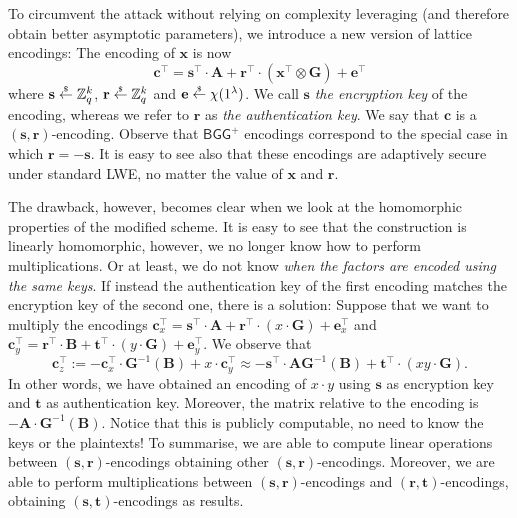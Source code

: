 \documentclass{theoretics}
\newcommand{\getsr}{\overset{\raisebox{-1pt}{$\scriptscriptstyle \$$}}{\gets}}
\newcommand{\sample}{\getsr}
\newcommand{\Z}{\mathbb{Z}}
\renewcommand{\sec}{\ensuremath{\lambda}}
\newcommand\bbbone{1}
\begin{document}
To circumvent the attack without relying on complexity leveraging (and therefore obtain better asymptotic parameters), we introduce a new version of lattice encodings: The encoding of $\mathbf{x}$ is now
\[\mathbf{c}^\intercal=\mathbf{s}^\intercal\cdot \mathbf{A}+\mathbf{r}^\intercal\cdot (\mathbf{x}^\intercal\otimes \mathbf{G})+\mathbf{e}^\intercal\]
where $\mathbf{s}\sample\Z_q^k$, $\mathbf{r}\sample\Z_q^k$ and $\mathbf{e}\sample\chi(\bbbone^\sec)$. We call $\mathbf{s}$ \emph{the encryption key} of the encoding, whereas we refer to $\mathbf{r}$ as \emph{the authentication key}. We say that $\mathbf{c}$ is a $(\mathbf{s}, \mathbf{r})$-encoding. Observe that $\mathsf{BGG^+}$ encodings correspond to the special case in which $\mathbf{r}=-\mathbf{s}$. It is easy to see also that these encodings are adaptively secure under standard LWE, no matter the value of $\mathbf{x}$ and $\mathbf{r}$.

The drawback, however, becomes clear when we look at the homomorphic properties of the modified scheme. It is easy to see that the construction is linearly homomorphic, however, we no longer know how to perform multiplications. Or at least, we do not know \emph{when the factors are encoded using the same keys}. If instead the authentication key of the first encoding matches the encryption key of the second one, there is a solution: Suppose that we want to multiply the encodings $\mathbf{c}_x^\intercal=\mathbf{s}^\intercal\cdot \mathbf{A}+\mathbf{r}^\intercal\cdot (x\cdot \mathbf{G})+\mathbf{e}_x^\intercal$ and $\mathbf{c}_y^\intercal=\mathbf{r}^\intercal\cdot \mathbf{B}+\mathbf{t}^\intercal\cdot (y\cdot \mathbf{G})+\mathbf{e}_y^\intercal$. We observe that
\[\mathbf{c}_z^\intercal:=-\mathbf{c}_x^\intercal\cdot \mathbf{G}^{-1}(\mathbf{B})+x\cdot \mathbf{c}_y^\intercal\approx-\mathbf{s}^\intercal\cdot \mathbf{A} \mathbf{G}^{-1}(\mathbf{B})+\mathbf{t}^\intercal \cdot (x y\cdot \mathbf{G}).\]
In other words, we have obtained an encoding of $x\cdot y$ using $\mathbf{s}$ as encryption key and $\mathbf{t}$ as authentication key. Moreover, the matrix relative to the encoding is $-\mathbf{A}\cdot \mathbf{G}^{-1}(\mathbf{B})$. Notice that this is publicly computable, no need to know the keys or the plaintexts! To summarise, we are able to compute linear operations between $(\mathbf{s}, \mathbf{r})$-encodings obtaining other $(\mathbf{s}, \mathbf{r})$-encodings. Moreover, we are able to perform multiplications between $(\mathbf{s}, \mathbf{r})$-encodings and $(\mathbf{r}, \mathbf{t})$-encodings, obtaining $(\mathbf{s}, \mathbf{t})$-encodings as results.
\end{document}
